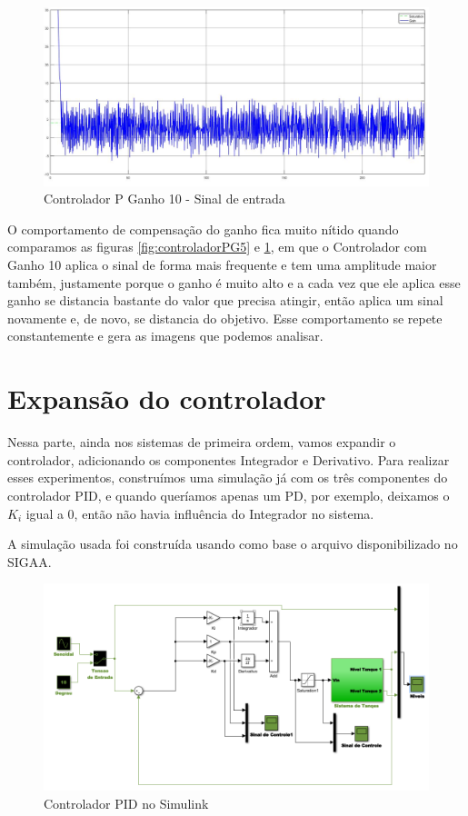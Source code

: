 \documentclass[
	12pt,				%
	openany,			%
	oneside,			%
	a4paper,			%
	english,			%
	french,				%
	spanish,			%
	brazil,				%
	]{abntex2}
\begin{document}
{\begin{figure}[h]
	\centering
	\includegraphics[scale=0.33]{osciloscopio_ganho_10.jpg}
	\caption{Controlador P Ganho 10 - Sinal de entrada}
	\label{fig:controladorPG10}
\end{figure}

O comportamento de compensação do ganho fica muito nítido quando comparamos as figuras \ref{fig:controladorPG5} e \ref{fig:controladorPG10}, em que o Controlador com Ganho 10 aplica o sinal de forma mais frequente e tem uma amplitude maior também, justamente porque o ganho é muito alto e a cada vez que ele aplica esse ganho se distancia bastante do valor que precisa atingir, então aplica um sinal novamente e, de novo, se distancia do objetivo. Esse comportamento se repete constantemente e gera as imagens que podemos analisar.

\clearpage
\section{Expansão do controlador}

Nessa parte, ainda nos sistemas de primeira ordem, vamos expandir o controlador, adicionando os componentes Integrador e Derivativo. Para realizar esses experimentos, construímos uma simulação já com os três componentes do controlador PID, e quando queríamos apenas um PD, por exemplo, deixamos o $K_i$ igual a 0, então não havia influência do Integrador no sistema. 

A simulação usada foi construída usando como base o arquivo disponibilizado no SIGAA.

\begin{figure}[h]
	\centering
	\includegraphics[scale=0.55]{Controlador_pid.PNG}
	\caption{Controlador PID no Simulink}
	\label{fig:controladorPID}
\end{figure}

}
\end{document}
